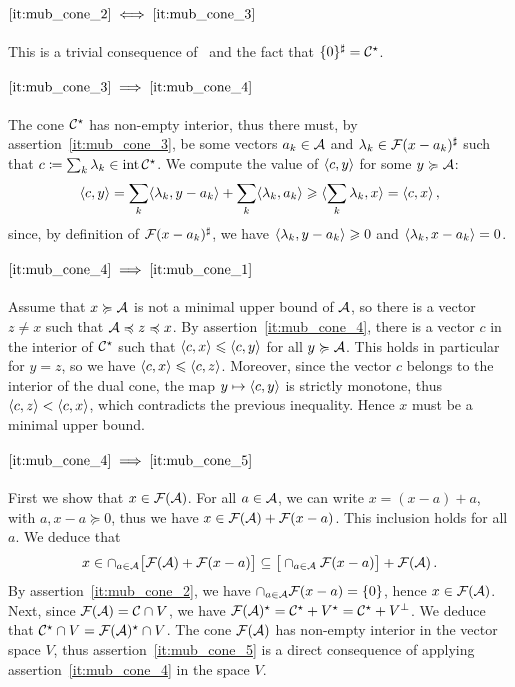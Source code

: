 \documentclass[main]{subfiles}
\begin{document}
\paragraph{$\eqref{it:mub_cone_2} \iff \eqref{it:mub_cone_3}$}
This is a trivial consequence of~ and the fact that $\{0\}^\sharp = \mathcal{C}^\star$.

\paragraph{$ \eqref{it:mub_cone_3} \implies \eqref{it:mub_cone_4} $}
The cone $\mathcal{C}^\star$ has non-empty interior, thus there must, by assertion~\eqref{it:mub_cone_3}, be some vectors $a_k \in \mathcal{A}$ and $\lambda_k \in \mathcal{F}(x-a_k)^\sharp$ such that $c \coloneqq \sum_k \lambda_k \in \operatorname{int} \mathcal{C}^\star$. We compute the value of $\langle {c} , {y} \rangle$ for some $y \succcurlyeq \mathcal{A}$:
\begin{align*}
\langle {c} , {y} \rangle = \sum_k \langle {\lambda_k} , {y -a_k} \rangle + \sum_k \langle {\lambda_k} , {a_k} \rangle 
\geqslant \langle {\sum_k \lambda_k} , {x} \rangle 
= \langle {c} , {x} \rangle \,, 
\end{align*}
since, by definition of $\mathcal{F}(x-a_k)^\sharp$, we have $\langle {\lambda_k} , {y-a_k} \rangle \geqslant 0$ and $\langle {\lambda_k} , {x-a_k} \rangle = 0$.

\paragraph{$ \eqref{it:mub_cone_4} \implies \eqref{it:mub_cone_1} $}
Assume that $x \succcurlyeq \mathcal{A}$ is not a minimal upper bound of $\mathcal{A}$, so there is a vector $z \neq x$ such that $\mathcal{A} \preccurlyeq z \preccurlyeq x$.
By assertion~\eqref{it:mub_cone_4}, there is a vector $c$ in the interior of $\mathcal{C}^\star$ such that $\langle {c} , {x} \rangle \leqslant \langle {c} , {y} \rangle$ for all $y \succcurlyeq \mathcal{A}$. This holds in particular for $y = z$, so we have $\langle {c} , {x} \rangle \leqslant \langle {c} , {z} \rangle$.
Moreover, since the vector $c$ belongs to the interior of the dual cone, the map $y \mapsto \langle {c} , {y} \rangle$ is strictly monotone, thus $\langle {c} , {z} \rangle < \langle {c} , {x} \rangle$, which contradicts the previous inequality. Hence $x$ must be a minimal upper bound.

\paragraph{$ \eqref{it:mub_cone_4} \implies \eqref{it:mub_cone_5} $}
First we show that $x \in \mathcal{F}(\mathcal{A})$. For all $a \in \mathcal{A}$, we can write $x = (x-a) + a$, with $a, x-a \succeq 0$, thus we have $x \in \mathcal{F}(\mathcal{A}) + \mathcal{F}(x-a)$. This inclusion holds for all $a$. We deduce that
\begin{align*}
x \in \cap_{a \in \mathcal{A}} \big[ \mathcal{F}(\mathcal{A}) + \mathcal{F}(x-a) \big] \subseteq \big[ \cap_{a\in \mathcal{A}} \mathcal{F}(x-a) \big] + \mathcal{F}(\mathcal{A})  \,.
\end{align*}
 By assertion~\eqref{it:mub_cone_2}, we have $\cap_{a\in \mathcal{A}} \mathcal{F}(x-a) = \{0\}$, hence $x \in \mathcal{F}(\mathcal{A})$.
Next, since $\mathcal{F}(\mathcal{A}) = \mathcal{C} \cap V$, we have $\mathcal{F}(\mathcal{A})^\star = \mathcal{C}^\star + V^\star = \mathcal{C}^\star + V^\perp$. We deduce that $\mathcal{C}^\star \cap V = \mathcal{F}(\mathcal{A})^\star \cap V$.
The cone $\mathcal{F}(\mathcal{A})$ has non-empty interior in the vector space $V$, thus assertion~\eqref{it:mub_cone_5} is a direct consequence of applying assertion~\eqref{it:mub_cone_4} in the space $V$. 
\end{document}
